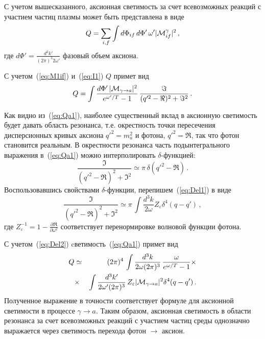 С учетом вышесказанного, аксионная светимость за счет всевозможных реакций с участием 
частиц плазмы может быть представлена  в виде 
%
\begin{equation}
Q = \sum_{i,f} \int d\Phi_{if} \, d\Phi' \, \omega' 
|{\cal M}^{\gamma}_{if}|^2 \, ,
\label{eq:Qa0}                                                       
\end{equation}
%
\noindent где $d\Phi' = \frac{d^3 k'}{(2\pi)^3 2 \omega'}$  фазовый объем аксиона. 

С учетом~(\ref{eq:M1if}) и~(\ref{eq:I1}) $Q$ примет вид
%
\begin{equation}
Q = \int  \frac{d\Phi' \, |{\cal M}_{\gamma \to a}|^2}{e^{\omega'/T} - 1} \, 
\frac{\Im
} 
{(q'^2 -\Re)^2 + \Im^2} \, .
\label{eq:Qa1}                                                       
\end{equation}
%

Как видно из~(\ref{eq:Qa1}), наиболее существенный вклад в аксионную светимость будет
давать область резонанса, т.е. окрестность точки пересечения дисперсионных кривых
аксиона $q'^2 = m_a^2$ и фотона, $q'^2 = \Re$, так 
что фотон становится реальным. В окрестности резонанса часть подынтегрального выражения
в~(\ref{eq:Qa1}) можно интерполировать $\delta$-функцией:  
%
\begin{equation}
 \frac{\Im}
{(q'^2 -\Re)^2 + \Im^2} \simeq \pi \, \delta(q'^2 -\Re) \, .
\label{eq:Del1}
\end{equation}
%
\noindent Воспользовавшись свойствами $\delta$-функции, перепишем~(\ref{eq:Del1})
 в виде  
%
\begin{equation}
 \frac{\Im}
{(q'^2 -\Re)^2 + \Im^2} \simeq \pi \, 
\int \frac{d^3 k}{2 \omega} Z_{\varepsilon} \delta^4 (q-q') \, ,
\label{eq:Del2}
\end{equation}
%
\noindent где  $Z_{\varepsilon}^{-1} = 1-\frac{\partial \Re}{\partial \omega^2}$ 
соответствует перенормировке волновой функции фотона.


 С учетом~(\ref{eq:Del2}) cветимость~(\ref{eq:Qa1}) примет вид 
%
\begin{eqnarray}
\label{eq:Qa2}
Q &\simeq&  (2\pi)^4 \, 
\int \frac{d^3 k}{2 \omega (2\pi)^3} \,\frac{\omega}{e^{\omega/T} - 1} \times
\\
\nonumber 
&\times& \int \frac{d^3 k'}{2 \omega' (2\pi)^3}\, Z_{\varepsilon} 
|{\cal M}_{\gamma \to a}|^2 \delta^4 (q-q') \, .
\end{eqnarray}
%
\noindent Полученное выражение в точности соответствует формуле для аксионной светимости  
в процессе $\gamma \to a$. Таким образом, аксионная светимость в 
области резонанса за счет всевозможных  
реакций с участием частиц среды 
  однозначно выражается через светимость перехода фотон $\to$ 
аксион.


